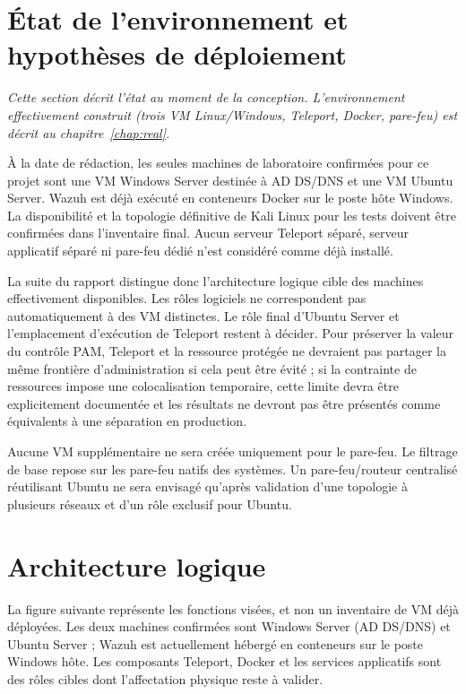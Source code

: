\documentclass[11pt,a4paper]{report}
\begin{document}
\section{État de l'environnement et hypothèses de déploiement}
\textit{Cette section décrit l'état au moment de la conception. L'environnement effectivement construit (trois VM Linux/Windows, Teleport, Docker, pare-feu) est décrit au chapitre~\ref{chap:real}.}

À la date de rédaction, les seules machines de laboratoire confirmées pour ce projet sont une VM Windows Server destinée à AD DS/DNS et une VM Ubuntu Server. Wazuh est déjà exécuté en conteneurs Docker sur le poste hôte Windows. La disponibilité et la topologie définitive de Kali Linux pour les tests doivent être confirmées dans l'inventaire final. Aucun serveur Teleport séparé, serveur applicatif séparé ni pare-feu dédié n'est considéré comme déjà installé.

La suite du rapport distingue donc l'architecture logique cible des machines effectivement disponibles. Les rôles logiciels ne correspondent pas automatiquement à des VM distinctes. Le rôle final d'Ubuntu Server et l'emplacement d'exécution de Teleport restent à décider. Pour préserver la valeur du contrôle PAM, Teleport et la ressource protégée ne devraient pas partager la même frontière d'administration si cela peut être évité ; si la contrainte de ressources impose une colocalisation temporaire, cette limite devra être explicitement documentée et les résultats ne devront pas être présentés comme équivalents à une séparation en production.

Aucune VM supplémentaire ne sera créée uniquement pour le pare-feu. Le filtrage de base repose sur les pare-feu natifs des systèmes. Un pare-feu/routeur centralisé réutilisant Ubuntu ne sera envisagé qu'après validation d'une topologie à plusieurs réseaux et d'un rôle exclusif pour Ubuntu.

\section{Architecture logique}
La figure suivante représente les fonctions visées, et non un inventaire de VM déjà déployées. Les deux machines confirmées sont Windows Server (AD DS/DNS) et Ubuntu Server ; Wazuh est actuellement hébergé en conteneurs sur le poste Windows hôte. Les composants Teleport, Docker et les services applicatifs sont des rôles cibles dont l'affectation physique reste à valider.
\end{document}
